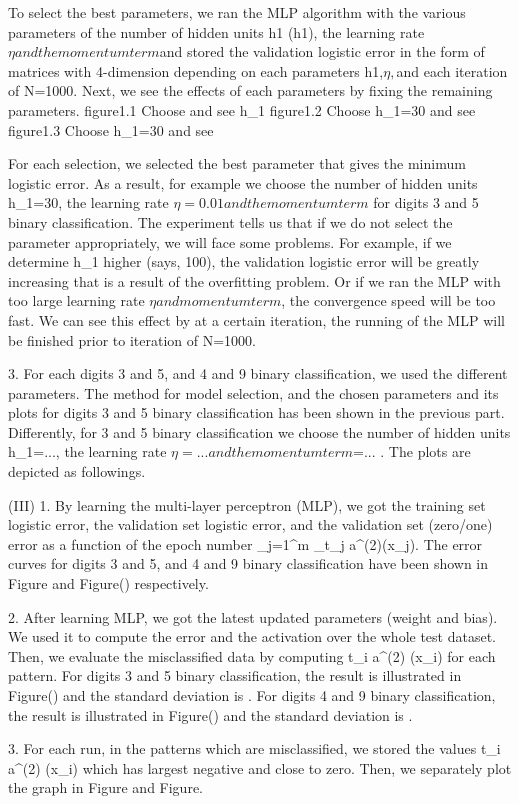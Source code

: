 To select the best parameters, we ran the MLP algorithm with the various parameters of the number of hidden units h1 (h1\belong ), the learning rate $\eta and the momentum term $\mu and stored the validation logistic error in the form of matrices with 4-dimension depending on each parameters h1,$\eta,$\mu and each iteration of N=1000. Next, we see the effects of each parameters by fixing the remaining parameters.
figure1.1  Choose   and see h_1
figure1.2  Choose h_1=30  and see \mu
figure1.3  Choose h_1=30  and see \eta

For each selection, we selected the best parameter that gives the minimum logistic error. As a result, for example we choose the number of hidden units h_1=30, the learning rate $\eta=0.01 and the momentum term $ for digits 3 and 5 binary classification. The experiment tells us that if we do not select the parameter appropriately, we will face some problems. For example, if we determine h_1 higher (says, 100), the validation logistic error will be greatly increasing that is a result of the overfitting problem. Or if we ran the MLP with too large learning rate $\eta and momentum term $\mu , the convergence speed will be too fast. We can see this effect by at a certain iteration, the running of the MLP will be finished prior to iteration of N=1000.

3. For each digits 3 and 5, and 4 and 9 binary classification, we used the different parameters. The method for model selection, and the chosen parameters and its plots for digits 3 and 5 binary classification has been shown in the previous part.  Differently, for 3 and 5 binary classification we choose the number of hidden units h_1=..., the learning rate $\eta=... and the momentum term $\mu=... . The plots are depicted as followings.

(III) 1. By learning the multi-layer perceptron (MLP), we got the training set logistic error, the validation set logistic error, and the validation set (zero/one) error as a function of the epoch number
\sum_{j=1}^m \1_{t_j a^(2)(x_j)}. 
The error curves for digits 3 and 5, and 4 and 9 binary classification have been shown in Figure and Figure() respectively.

2. After learning MLP, we got the latest updated parameters (weight and bias). We used it to compute the error and the activation over the whole test dataset. Then, we evaluate the misclassified data by computing t_i a^(2) (x_i) for each pattern. For digits 3 and 5 binary classification, the result is illustrated in Figure() and the standard deviation is . For digits 4 and 9 binary classification, the result is illustrated in Figure() and the standard deviation is . 

3. For each run, in the patterns which are misclassified, we stored the values t_i a^(2) (x_i) which has largest negative and close to zero. Then, we separately plot the graph in Figure and Figure.
